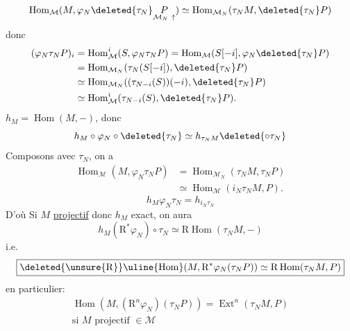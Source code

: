 \[
\operatorname{Hom}_{\mathcal M}(M,\varphi_N\deleted{\tau_N}
 \underset{\mathcal M_N\ \uparrow}{P})
 \simeq\operatorname{Hom}_{\mathcal M_N}(\tau_NM,\deleted{\tau_N}P)
\]
donc
\[
\begin{aligned}
(\varphi_N\tau_NP)_i
 &=\operatorname{Hom}^i_{\mathcal M}(S,\varphi_N\tau_NP)
 =\operatorname{Hom}_{\mathcal M}(S[-i],\varphi_N\deleted{\tau_N}P)\\
 &=\operatorname{Hom}_{\mathcal M_N}(\tau_N(S[-i]),\deleted{\tau_N}P)\\
 &\simeq\operatorname{Hom}_{\mathcal M_N}((\tau_{N-i}(S))(-i),\deleted{\tau_N}P)\\
 &\simeq\operatorname{Hom}^i_{\mathcal M}(\tau_{N-i}(S),\deleted{\tau_N}P).
\end{aligned}
\]
\uline{\hspace{15em}}
\(h_M=\operatorname{Hom}(M,-)\), donc
\[
h_M\circ\varphi_N\circ\deleted{\tau_N}\simeq
 h_{\tau_NM}\deleted{\circ\tau_N}
\]
Composons avec \(\tau_N\), on a
\[
\begin{aligned}
\operatorname{Hom}_{\mathcal M}(M,\varphi_N\tau_NP)
 &=\operatorname{Hom}_{\mathcal M_N}(\tau_NM,\tau_NP)\\
 &\simeq\operatorname{Hom}_{\mathcal M}(i_N\tau_NM,P).
\end{aligned}
\]
\[h_M\varphi_N\tau_N=h_{i_N\tau_N}\]
D'où
Si \(M\) \uline{projectif} donc \(h_M\) exact, on aura
\[
h_M(\mathrm R^*\varphi_N)\circ\tau_N\simeq
 \mathrm R\operatorname{Hom}(\tau_NM,-)
\]
i.e.
\[
\boxed{\deleted{\unsure{\mathrm R}}\uline{\operatorname{Hom}}(M,\mathrm R^*\varphi_N(\tau_NP))
 \simeq\mathrm R\operatorname{Hom}(\tau_NM,P)}
\]
en particulier:
\[
\boxed{\begin{gathered}
\operatorname{Hom}(M,(\mathrm R^n\varphi_N)(\tau_NP))
 =\operatorname{Ext}^n(\tau_NM,P)\\
\text{si }M\text{ projectif }\in\mathcal M
\end{gathered}}
\]
